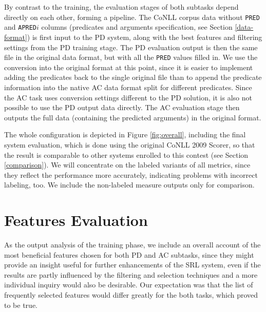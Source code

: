 \documentclass[12pt,notitlepage]{report}
\begin{document}
By contrast to the training, the evaluation stages of both subtasks depend directly on each other, forming a pipeline. The CoNLL corpus data without \texttt{PRED} and \texttt{APRED$i$} columns (predicates and arguments specification, see Section \ref{data-format}) is first input to the PD system, along with the best features and filtering settings from the PD training stage. The PD evaluation output is then the same file in the original data format, but with all the \texttt{PRED} values filled in. We use the conversion into the original format at this point, since it is easier to implement adding the predicates back to the single original file than to append the predicate information into the native AC data format split for different predicates. Since the AC task uses conversion settings different to the PD solution, it is also not possible to use the PD output data directly. The AC evaluation stage then outputs the full data (containing the predicted arguments) in the original format.

The whole configuration is depicted in Figure \ref{fig:overall}, including the final system evaluation, which is done using the original CoNLL 2009 Scorer, so that the result is comparable to other systems enrolled to this contest (see Section \ref{comparison}). We will concentrate on the labeled variants of all metrics, since they reflect the performance more accurately, indicating problems with incorrect labeling, too. We include the non-labeled measure outputs only for comparison.

\section{Features Evaluation}\label{selfeats}

As the output analysis of the training phase, we include an overall account of the most beneficial features chosen for both PD and AC subtasks, since they might provide an insight useful for further enhancements of the SRL system, even if the results are partly influenced by the filtering and selection techniques and a more individual inquiry would also be desirable. Our expectation was that the list of frequently selected features would differ greatly for the both tasks, which proved to be true.
\end{document}
